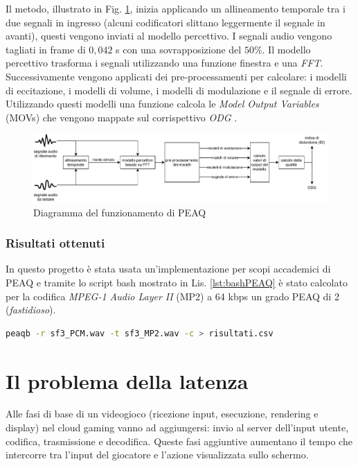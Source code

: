 Il metodo, illustrato in Fig. \ref{fig:PEAQ}, inizia applicando un allineamento temporale tra i due segnali in ingresso (alcuni codificatori slittano leggermente il segnale in avanti), questi vengono inviati al modello percettivo. I segnali audio vengono tagliati in frame di $0,042$ s con una sovrapposizione del $50\%$. Il modello percettivo trasforma i segnali utilizzando una funzione finestra e una \textit{FFT}. Successivamente vengono applicati dei pre-processamenti per calcolare: i modelli di eccitazione, i modelli di volume, i modelli di modulazione e il segnale di errore. Utilizzando questi modelli una funzione calcola le \textit{Model Output Variables} (MOVs) che vengono mappate sul corrispettivo \textit{ODG} \parencite{PEAQ}.

\begin{figure}[H]
	\includegraphics[width=\linewidth]{immagini/PEAQ}
	\caption{Diagramma del funzionamento di PEAQ}	
	\label{fig:PEAQ}
\end{figure}



\subsubsection{Risultati ottenuti}
In questo progetto è stata usata un'implementazione per scopi accademici di PEAQ e tramite lo script bash mostrato in Lis. \ref{lst:bashPEAQ} è stato calcolato per la codifica \textit{MPEG-1 Audio Layer II} (MP2) a 64 kbps un grado PEAQ di 2 (\textit{fastidioso}).

\begin{lstlisting}[language=bash, caption=Script bash per l'esecuzione del programma per l'algoritmo PEAQ, label={lst:bashPEAQ}]
peaqb -r sf3_PCM.wav -t sf3_MP2.wav -c > risultati.csv
\end{lstlisting}




\section{Il problema della latenza} \label{sec:cap4_Latenza}
Alle fasi di base di un videogioco (ricezione input, esecuzione, rendering e display) nel cloud gaming vanno ad aggiungersi: invio al server dell'input utente, codifica, trasmissione e decodifica. Queste fasi aggiuntive aumentano il tempo che intercorre tra l'input del giocatore e l'azione visualizzata sullo schermo.

